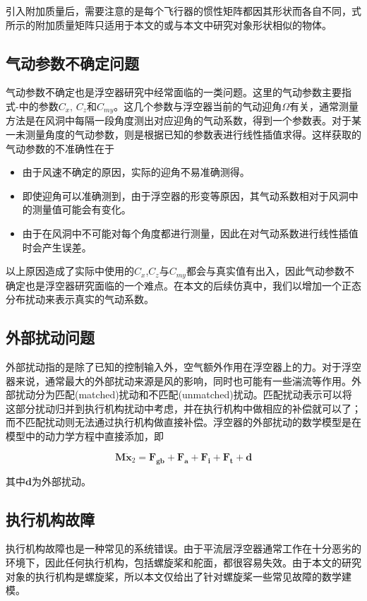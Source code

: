 引入附加质量后，需要注意的是每个飞行器的惯性矩阵都因其形状而各自不同，式所示的附加质量矩阵只适用于本文的或与本文中研究对象形状相似的物体。

\subsection{气动参数不确定问题}
气动参数不确定也是浮空器研究中经常面临的一类问题。这里的气动参数主要指式-中的参数$C_x$, $C_z$和$C_{my}$。这几个参数与浮空器当前的气动迎角$\Omega$有关，通常测量方法是在风洞中每隔一段角度测出对应迎角的气动系数，得到一个参数表。对于某一未测量角度的气动参数，则是根据已知的参数表进行线性插值求得。这样获取的气动参数的不准确性在于

\begin{itemize}
    \item 由于风速不确定的原因，实际的迎角不易准确测得。
    \item 即使迎角可以准确测到，由于浮空器的形变等原因，其气动系数相对于风洞中的测量值可能会有变化。
    \item 由于在风洞中不可能对每个角度都进行测量，因此在对气动系数进行线性插值时会产生误差。
\end{itemize}

以上原因造成了实际中使用的$C_x$,$C_z$与$C_{my}$都会与真实值有出入，因此气动参数不确定也是浮空器研究面临的一个难点。在本文的后续仿真中，我们以增加一个正态分布扰动来表示真实的气动系数。

\subsection{外部扰动问题}
外部扰动指的是除了已知的控制输入外，空气额外作用在浮空器上的力。对于浮空器来说，通常最大的外部扰动来源是风的影响，同时也可能有一些湍流等作用。外部扰动分为匹配(matched)扰动和不匹配(unmatched)扰动。匹配扰动表示可以将这部分扰动归并到执行机构扰动中考虑，并在执行机构中做相应的补偿就可以了；而不匹配扰动则无法通过执行机构做直接补偿。浮空器的外部扰动的数学模型是在模型中的动力学方程中直接添加，即

\begin{equation}
    \mathbf{M}\dot{\mathbf{x}}_2 = \mathbf{F_{gb}} + \mathbf{F_a} + \mathbf{F_i} + \mathbf{F_t} + \mathbf{d}
\end{equation}

其中$\mathbf{d}$为外部扰动。

\subsection{执行机构故障}
执行机构故障也是一种常见的系统错误。由于平流层浮空器通常工作在十分恶劣的环境下，因此任何执行机构，包括螺旋桨和舵面，都很容易失效。由于本文的研究对象的执行机构是螺旋桨，所以本文仅给出了针对螺旋桨一些常见故障的数学建模。

